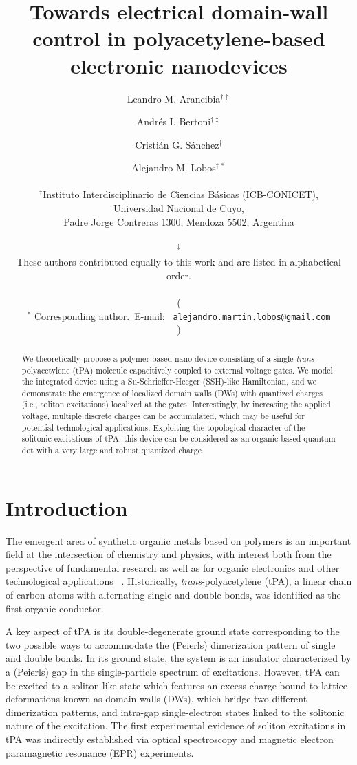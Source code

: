 \documentclass[10pt,a4paper]{article}
\author{Leandro M. Arancibia$^{\dagger\ddagger}$  \and  Andrés I. Bertoni$^{\dagger\ddagger}$ \and Cristián G. Sánchez$^{\dagger}$ \and Alejandro M. Lobos$^{\dagger\,*}$  \\ 
\\ $^\dagger$Instituto Interdisciplinario de Ciencias Básicas (ICB-CONICET),\\ Universidad Nacional de Cuyo,\\ Padre Jorge Contreras 1300, Mendoza 5502, Argentina \\\\
$^\ddagger$ \begin{normalsize}
These authors contributed equally to this work and are listed in alphabetical order.
\end{normalsize}\\
(\begin{normalsize}
$^*$ Corresponding author.~E-mail:~ \texttt{alejandro.martin.lobos@gmail.com}
\end{normalsize})
}
\title{Towards electrical domain-wall control in polyacetylene-based electronic nanodevices}
\begin{document}
\maketitle
\begin{abstract}
We theoretically propose a polymer-based nano-device consisting of a single \textit{trans}-polyacetylene (tPA) molecule capacitively coupled to external voltage gates. We model the integrated device using a Su-Schrieffer-Heeger (SSH)-like Hamiltonian, and we demonstrate the emergence of localized domain walls (DWs) with quantized charges (i.e., soliton excitations) localized at the gates. Interestingly, by increasing the applied voltage, multiple discrete charges can be accumulated, which may be useful for potential technological applications. Exploiting the topological character of the solitonic excitations of tPA, this device can be considered as an organic-based quantum dot with a very large and robust quantized charge.
\end{abstract}

\section{Introduction}
\label{sec:intro}
The emergent area of synthetic organic metals based on polymers is an important field at the intersection of chemistry and physics, with interest
both from the perspective of fundamental research as well as for organic electronics and other technological applications ~\cite{Farchioni_Grosso_Organic_electronic_metals_book}. Historically, \textit{trans}-polyacetylene (tPA), a linear chain of carbon atoms with alternating single and double bonds, was identified as the first organic conductor\cite{Heeger88_Solitons_in_conducting_polymers, Su79_Solitons_in_polyacetylene}. 

A key aspect of tPA is its double-degenerate ground state corresponding to the two possible ways to accommodate the (Peierls) dimerization pattern of single and double bonds. In its ground state, the system is an insulator characterized by a (Peierls) gap in the single-particle spectrum of excitations. However, tPA can be excited to a soliton-like state
which features an excess charge bound to lattice deformations known as domain walls (DWs), which bridge two different dimerization patterns, and intra-gap single-electron states linked to the solitonic nature of the excitation. The first experimental evidence of  soliton excitations in tPA was indirectly established via optical spectroscopy\cite{sethna1982photoinduced, blanchet1983photoexcitations} and magnetic electron paramagnetic resonance (EPR) experiments\cite{goldberg1979electron, weinberger1980electron}.
\end{document}

